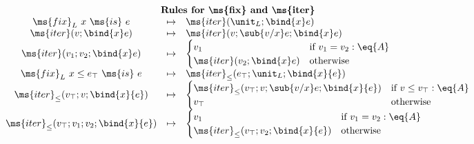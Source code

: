 \documentclass{article}
\newcommand{\tfix}[2]{\ms{fix}_{#1}~{#2}~\ms{is}~}
\newcommand{\tfixle}[3]{\tfix{#1}{#2 \le #3}}
\newcommand{\iter}[3]{\ms{iter}({#1}; \bind{#2}#3)}
\newcommand{\iterstep}[4]{\ms{iter}({#1}; {#2}; {\bind{#3}#4})}
\newcommand{\iterle}[4]{\ms{iter}_\le({#1}; {#2}; \bind{#3}{#4})}
\newcommand{\iterlestep}[5]{\ms{iter}_\le({#1}; {#2}; {#3}; \bind{#4}{#5})}
\newcommand{\step}{\mapsto}
\begin{document}
\[\begin{array}{ccl}
  \vspace{0.5em}\\
  \multicolumn{3}{c}{\textbf{Rules for \ms{fix} and \ms{iter}}}\\
  \tfix{L}{x}{e} &\step& \iter{\unit_L}{x}{e}\\
  \iter{v}{x}{e} &\step& \iterstep{v}{\sub{v/x} e}{x}{e}\\
  \iterstep{v_1}{v_2}{x}{e}
  &\step& \begin{cases}
    v_1 & \text{if}~{v_1 = v_2 : \eq{A}}\\
    \iter{v_2}{x}{e} & \text{otherwise}
  \end{cases}\\
  \tfixle{L}{x}{e_\top}{e} &\step& \iterle{e_\top}{\unit_L}{x}{e}\\
  \iterle{v_\top}{v}{x}{e}
  &\step& \begin{cases}
    \iterlestep{v_\top}{v}{\sub{v/x} e}{x}{e} & \text{if}~{v \le v_\top : \eq{A}}\\
    v_\top & \text{otherwise}
  \end{cases}\\
  \iterlestep{v_\top}{v_1}{v_2}{x}{e}
  &\step& \begin{cases}
    v_1 &\text{if}~{v_1 = v_2 : \eq{A}}\\
    \iterle{v_\top}{v_2}{x}{e} & \text{otherwise}
  \end{cases}
\end{array}
\]
\end{document}
